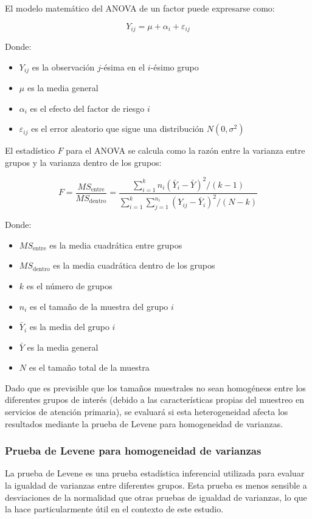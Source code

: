 \documentclass[11pt,letterpaper]{report}
\begin{document}
El modelo matemático del ANOVA de un factor puede expresarse como:

\begin{equation}
Y_{ij} = \mu + \alpha_i + \varepsilon_{ij}
\end{equation}

Donde:
\begin{itemize}
    \item $Y_{ij}$ es la observación $j$-ésima en el $i$-ésimo grupo
    \item $\mu$ es la media general
    \item $\alpha_i$ es el efecto del factor de riesgo $i$
    \item $\varepsilon_{ij}$ es el error aleatorio que sigue una distribución $N(0, \sigma^2)$
\end{itemize}

El estadístico $F$ para el ANOVA se calcula como la razón entre la varianza
entre grupos y la varianza dentro de los grupos:

\begin{equation}
F = \frac{MS_{\text{entre}}}{MS_{\text{dentro}}} = \frac{\sum_{i=1}^{k} n_i(\bar{Y}_i - \bar{Y})^2/(k-1)}{\sum_{i=1}^{k}\sum_{j=1}^{n_i} (Y_{ij} - \bar{Y}_i)^2/(N-k)}
\end{equation}

Donde:
\begin{itemize}
    \item $MS_{\text{entre}}$ es la media cuadrática entre grupos
    \item $MS_{\text{dentro}}$ es la media cuadrática dentro de los grupos
    \item $k$ es el número de grupos
    \item $n_i$ es el tamaño de la muestra del grupo $i$
    \item $\bar{Y}_i$ es la media del grupo $i$
    \item $\bar{Y}$ es la media general
    \item $N$ es el tamaño total de la muestra
\end{itemize}

Dado que es previsible que los tamaños muestrales no sean homogéneos entre los
diferentes grupos de interés (debido a las características propias del muestreo
en servicios de atención primaria), se evaluará si esta heterogeneidad afecta
los resultados mediante la prueba de Levene para homogeneidad de varianzas. 

\subsubsection{Prueba de Levene para homogeneidad de varianzas}
La prueba de Levene es una prueba estadística inferencial utilizada para
evaluar la igualdad de varianzas entre diferentes grupos. Esta prueba es menos
sensible a desviaciones de la normalidad que otras pruebas de igualdad de
varianzas, lo que la hace particularmente útil en el contexto de este estudio.
\end{document}
